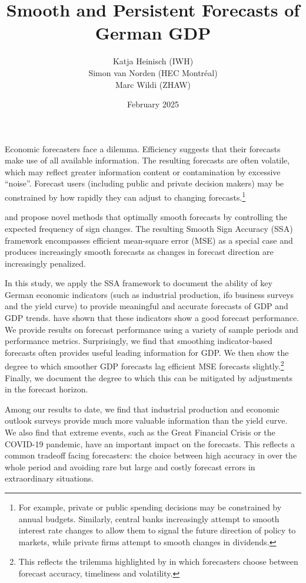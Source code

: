 \documentclass{article}
\title{Smooth and Persistent Forecasts of German GDP}
\author{Katja Heinisch (IWH)\\Simon van Norden (HEC Montréal)\\Marc Wildi (ZHAW)}
\date{February 2025}
\begin{document}
\maketitle

Economic forecasters face a dilemma. Efficiency suggests that their forecasts make use of all available information. The resulting forecasts are often volatile, which may reflect greater information content or contamination by excessive ``noise''. Forecast users (including public and private decision makers) may be constrained by how rapidly they can adjust to changing forecasts.\footnote{For example, private or public spending decisions may be constrained by annual budgets. Similarly, central banks increasingly attempt to smooth interest rate changes to allow them to signal the future direction of policy to markets, while private firms attempt to smooth changes in dividends.}

\cite{Wildi2024,Wildi2025} and \cite{McElroy2019,McElroy2020} propose novel methods that optimally smooth forecasts by controlling the expected frequency of sign changes. The resulting Smooth Sign Accuracy (SSA) framework encompasses efficient mean-square error (MSE) as a special case and produces increasingly smooth forecasts as changes in forecast direction are increasingly penalized. 

In this study, we apply the SSA framework to document the ability of key German economic indicators (such as industrial production, ifo business surveys and the yield curve) to provide meaningful and accurate forecasts of GDP and GDP trends.
\cite{Drechsel2012financial,Heinisch2018bottom} have shown that these indicators show a good forecast performance.
We provide results on forecast performance using a variety of sample periods and performance metrics. Surprisingly, we find that smoothing indicator-based forecasts often provides useful leading information for GDP. We then show the degree to which smoother GDP forecasts lag efficient MSE forecasts slightly.\footnote{This reflects the trilemma highlighted by \cite{McElroy2019} in which forecasters choose between forecast accuracy, timeliness and volatility.} Finally, we document the degree to which this can be mitigated by adjustments in the forecast horizon.

Among our results to date, we find that industrial production and economic outlook surveys provide much more valuable information than the yield curve. We also find that extreme events, such as the Great Financial Crisis or the COVID-19 pandemic, have an important impact on the forecasts. This reflects a common tradeoff facing forecasters: the choice between high accuracy in over the whole period and avoiding rare but large and costly forecast errors in extraordinary situations. 
\end{document}
